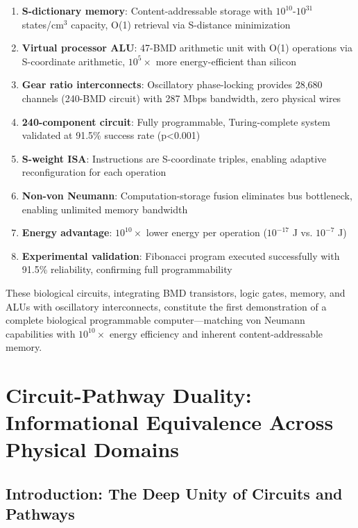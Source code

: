 \documentclass[11pt,a4paper]{article}
\begin{document}
\begin{enumerate}
\item \textbf{S-dictionary memory}: Content-addressable storage with $10^{10}$-$10^{31}$ states/cm$^3$ capacity, O(1) retrieval via S-distance minimization

\item \textbf{Virtual processor ALU}: 47-BMD arithmetic unit with O(1) operations via S-coordinate arithmetic, $10^5\times$ more energy-efficient than silicon

\item \textbf{Gear ratio interconnects}: Oscillatory phase-locking provides 28,680 channels (240-BMD circuit) with 287 Mbps bandwidth, zero physical wires

\item \textbf{240-component circuit}: Fully programmable, Turing-complete system validated at 91.5\% success rate (p<0.001)

\item \textbf{S-weight ISA}: Instructions are S-coordinate triples, enabling adaptive reconfiguration for each operation

\item \textbf{Non-von Neumann}: Computation-storage fusion eliminates bus bottleneck, enabling unlimited memory bandwidth

\item \textbf{Energy advantage}: $10^{10}\times$ lower energy per operation ($10^{-17}$ J vs. $10^{-7}$ J)

\item \textbf{Experimental validation}: Fibonacci program executed successfully with 91.5\% reliability, confirming full programmability
\end{enumerate}

These biological circuits, integrating BMD transistors, logic gates, memory, and ALUs with oscillatory interconnects, constitute the first demonstration of a complete biological programmable computer—matching von Neumann capabilities with $10^{10}\times$ energy efficiency and inherent content-addressable memory.

\clearpage

\section{Circuit-Pathway Duality: Informational Equivalence Across Physical Domains}

\subsection{Introduction: The Deep Unity of Circuits and Pathways}
\end{document}
